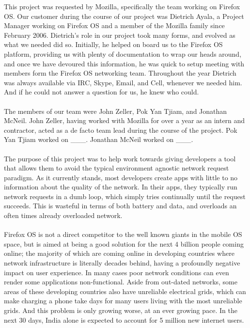 \documentclass[12pt]{article}
\begin{document}
This project was requested by Mozilla, specifically the team working on Firefox OS. Our customer during the course of our project was Dietrich Ayala, a Project Manager working on Firefox OS and a member of the Mozilla family since February 2006. Dietrich's role in our project took many forms, and evolved as what we needed did so. Initially, he helped on board us to the Firefox OS platform, providing us with plenty of documentation to wrap our heads around, and once we have devoured this information, he was quick to setup meeting with members form the Firefox OS networking team. Throughout the year Dietrich was always available via IRC, Skype, Email, and Cell, whenever we needed him. And if he could not answer a question for us, he knew who could.
\\\\
The members of our team were John Zeller, Pok Yan Tjiam, and Jonathan McNeil. John Zeller, having worked with Mozilla for over a year as an intern and contractor, acted as a de facto team lead during the course of the project. Pok Yan Tjiam worked on \_\_\_. Jonathan McNeil worked on \_\_\_.
\\\\
The purpose of this project was to help work towards giving developers a tool that allows them to avoid the typical environment agnostic network request paradigm. As it currently stands, most developers create apps with little to no information about the quality of the network. In their apps, they typically run network requests in a dumb loop, which simply tries continually until the request succeeds. This is wasteful in terms of both battery and data, and overloads an often times already overloaded network.
\\\\
Firefox OS is not a direct competitor to the well known giants in the mobile OS space, but is aimed at being a good solution for the next 4 billion people coming online; the majority of which are coming online in developing countries where network infrastructure is literally decades behind, having a profoundly negative impact on user experience. In many cases poor network conditions can even render some applications non-functional. Aside from out-dated networks, some areas of these developing countries also have unreliable electrical grids, which can make charging a phone take days for many users living with the most unreliable grids. And this problem is only growing worse, at an ever growing pace. In the next 30 days, India alone is expected to account for 5 million new internet users.
\end{document}
